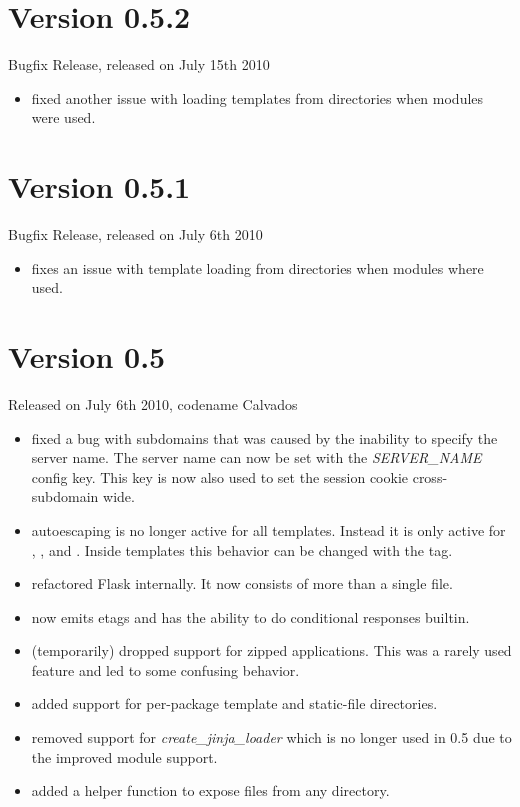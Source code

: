 \documentclass[a4paper,12pt]{sphinxmanual}
\begin{document}
\section{Version 0.5.2}
\label{changelog:blinker}\label{changelog:version-0-5-2}
Bugfix Release, released on July 15th 2010
\begin{itemize}
\item {} 
fixed another issue with loading templates from directories when
modules were used.

\end{itemize}


\section{Version 0.5.1}
\label{changelog:version-0-5-1}
Bugfix Release, released on July 6th 2010
\begin{itemize}
\item {} 
fixes an issue with template loading from directories when modules
where used.

\end{itemize}


\section{Version 0.5}
\label{changelog:version-0-5}
Released on July 6th 2010, codename Calvados
\begin{itemize}
\item {} 
fixed a bug with subdomains that was caused by the inability to
specify the server name.  The server name can now be set with
the \emph{SERVER\_NAME} config key.  This key is now also used to set
the session cookie cross-subdomain wide.

\item {} 
autoescaping is no longer active for all templates.  Instead it
is only active for , ,  and .
Inside templates this behavior can be changed with the
 tag.

\item {} 
refactored Flask internally.  It now consists of more than a
single file.

\item {} 
{\hyperref[api:flask.send_file]{}} now emits etags and has the ability to
do conditional responses builtin.

\item {} 
(temporarily) dropped support for zipped applications.  This was a
rarely used feature and led to some confusing behavior.

\item {} 
added support for per-package template and static-file directories.

\item {} 
removed support for \emph{create\_jinja\_loader} which is no longer used
in 0.5 due to the improved module support.

\item {} 
added a helper function to expose files from any directory.

\end{itemize}
\end{document}
